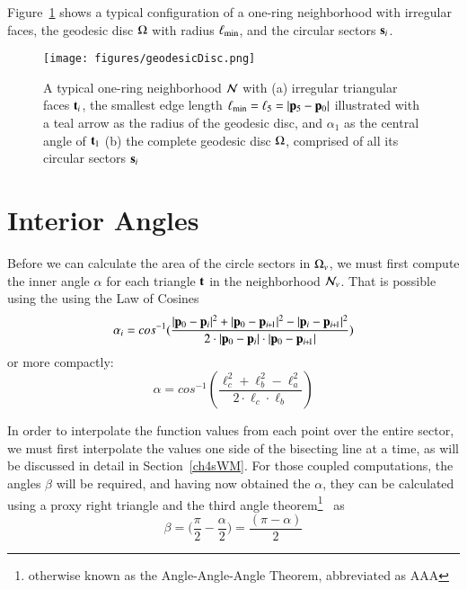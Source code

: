 Figure~\ref{fig:geodesicDisc} shows a typical configuration of a one-ring neighborhood with irregular faces, the geodesic disc $\Omega$ with radius $\ell_\text{min}$, and the circular sectors $\mathbf{s}_i$.

\begin{figure}[ht]
\ffigbox
	{\texttt{[image: figures/geodesicDisc.png]}}
	{\caption[One-ring and geodesic disc]{A typical one-ring neighborhood $\mathcal{N}$ with (a) irregular triangular faces $\mathbf{t}_i$, the smallest edge length $\ell_\text{min} = \ell_5 = |\mathbf{p}_5 - \mathbf{p}_0|$ illustrated with a teal arrow as the radius of the geodesic disc, and $\alpha_1$ as the central angle of $\mathbf{t}_1$ (b) the complete geodesic disc $\Omega$, comprised of all its circular sectors $\mathbf{s}_i$}\label{fig:geodesicDisc}}
\end{figure}%

%
%
%
%
\section{Interior Angles}
\label{ch4sIA}
Before we can calculate the area of the circle sectors in $\Omega_v$, we must first compute the inner angle $\alpha$ for each triangle $\mathbf{t}$ in the neighborhood $\mathcal{N}_v$. That is possible using the using the Law of Cosines~\cite{Weisstein19e}
%
\begin{equation}
	\alpha_i = cos^{-1}(\frac{|\bp_0 - \bp_{i}|^2 + |\bp_0 - \bp_{\sipo}|^2 - |\bp_i - \bp_{\sipo}|^2}{2\cdot|\bp_0 - \bp_{i}|\cdot|\bp_0 - \bp_{\sipo}|})
\end{equation}
%
or more compactly:
%
\begin{equation}
	\alpha = cos^{-1}\left (\frac{\ell_c^2 + \ell_b^2 - \ell_a^2}{2\cdot\ell_c\cdot\ell_b}\right )
	\label{eq:alphaFromEdgeLengths}
\end{equation}%
%

In order to interpolate the function values from each point over the entire sector, we must first interpolate the values one side of the bisecting line at a time, as will be discussed in detail in Section~\ref{ch4sWM}. For those coupled computations, the angles $\beta$ will be required, and having now obtained the $\alpha$, they can be calculated using a proxy right triangle and the third angle theorem\footnote{otherwise known as the Angle-Angle-Angle Theorem, abbreviated as AAA}~\cite{Weisstein19f} as
%
\begin{equation}
	\beta = \Big(\frac{\pi}{2} - \frac{\alpha}{2}\Big) = \frac{(\pi - \alpha)}{2}
	\label{eq:betaFromHalfAlpha}
\end{equation}%
%

